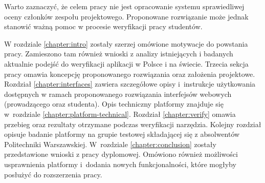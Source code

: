 Warto zaznaczyć, że celem pracy nie jest opracowanie systemu sprawiedliwej oceny członków zespołu projektowego.
Proponowane rozwiązanie może jednak stanowić ważną pomoc w procesie weryfikacji pracy studentów.

W rozdziale \ref{chapter:intro} zostały szerzej omówione motywacje do powstania pracy.
Zamieszono tam również wnioski z analizy istniejących i badanych aktualnie podejść do weryfikacji aplikacji w Polsce i na świecie.
Trzecia sekcja pracy omawia koncepcję proponowanego rozwiązania oraz założenia projektowe.
Rozdział \ref{chapter:interfaces} zawiera szczegółowe opisy i~instrukcje użytkowania dostępnych w ramach proponowanego rozwiązania interfejsów webowych (prowadzącego oraz studenta).
Opis techniczny platformy znajduje się w~rozdziale \ref{chapter:platform-technical}.
Rozdział \ref{chapter:verify} omawia przebieg oraz rezultaty otrzymane podczas weryfikacji narzędzia.
Kolejny rozdział opisuje badanie platformy na grupie testowej składającej się z absolwentów Politechniki Warszawskiej.
W~rozdziale \ref{chapter:conclusion} zostały przedstawione wnioski z pracy dyplomowej.
Omówiono również możliwości usprawnienia platformy i~dodania nowych funkcjonalności, które mogłyby posłużyć do rozszerzenia pracy.





